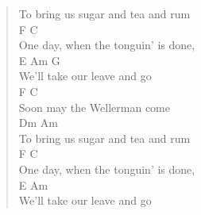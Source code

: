 \documentclass[11pt]{article}
\begin{document}
\begin{verse}
To bring us sugar and tea and rum\\
F                 C\\
One day, when the tonguin’ is done,\\
\hspace*{7em}E                 Am G\\
We’ll take our leave and go\\
\vspace*{1em}
\vspace*{1em}
\hspace*{1em}F            C\\
Soon may the Wellerman come\\
\hspace*{4em}Dm                 Am\\
To bring us sugar and tea and rum\\
F                 C\\
One day, when the tonguin’ is done,\\
\hspace*{7em}E                 Am\\
We’ll take our leave and go\\
\end{verse}
\clearpage
\end{document}
